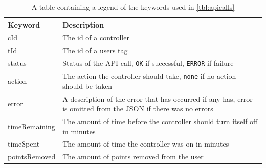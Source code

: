 \begin{table}[!h]
\begin{tabular}{| l | p{9cm} |}
\hline
Keyword & Description \\
\hline
cId & The id of a controller \\
\hline
tId & The id of a users tag \\
\hline
status & Status of the API call, \texttt{OK} if successful, \texttt{ERROR} if failure \\
\hline
action & The action the controller should take, \texttt{none} if no action should be taken \\
\hline
error & A description of the error that has occurred if any has, error is omitted from the JSON if there was no errors \\
\hline
timeRemaining & The amount of time before the controller should turn itself off in minutes \\
\hline
timeSpent & The amount of time the controller was on in minutes \\
\hline
pointsRemoved & The amount of points removed from the user \\
\hline
\end{tabular}
\caption{A table containing a legend of the keywords used in \autoref{tbl:apicalls}}
\label{tbl:apilegend}
\end{table}
